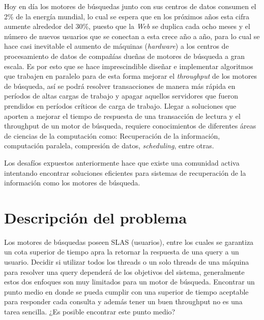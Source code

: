 Hoy en día los motores de búsquedas junto con sus centros de datos consumen el 2\% de la energía mundial, lo cual se espera que en los próximos años esta cifra aumente alrededor del 30\%, puesto que la \textit{Web} se duplica cada ocho meses y el número de nuevos usuarios que se conectan a esta crece año a año, para lo cual se hace casi inevitable el aumento de máquinas (\textit{hardware}) a los centros de procesamiento de datos de compañías dueñas de motores de búsqueda a gran escala. Es por esto que se hace imprescindible diseñar e implementar algoritmos que trabajen en paralelo para de esta forma mejorar el \textit{throughput} de los motores de búsqueda, así se podrá resolver transacciones de manera más rápida en períodos de altas cargas de trabajo y apagar aquellos servidores que fueron prendidos en períodos críticos de carga de trabajo. Llegar a soluciones que aporten a mejorar el tiempo de respuesta de una transacción de lectura y el throughput de un motor de búsqueda, requiere conocimientos de diferentes áreas de ciencias de la computación como: Recuperación de la información, computación paralela, compresión de datos, \textit{scheduling}, entre otras. 

Los desafíos expuestos anteriormente hace que existe una comunidad activa intentando encontrar soluciones eficientes para sistemas de recuperación de la información como los motores de búsqueda.  


\section{Descripci\'on del problema}
\label{intro:problema}


Los motores de búsquedas poseen SLAS (usuarios), entre los cuales se garantiza un cota superior de tiempo apra la retornar la respuesta de una query a un usuario. Decidir si utilizar todos los threads o un solo threads de una máquina para resolver una query dependerá de los objetivos del sistema, generalmente estos dos enfoques son muy limitados para un motor de búsqueda. Encontrar un punto medio en donde se pueda cumplir con una superior de tiempo aceptable para responder cada consulta y además tener un buen throughput no es una tarea sencilla. ¿Es posible encontrar este punto medio? 

